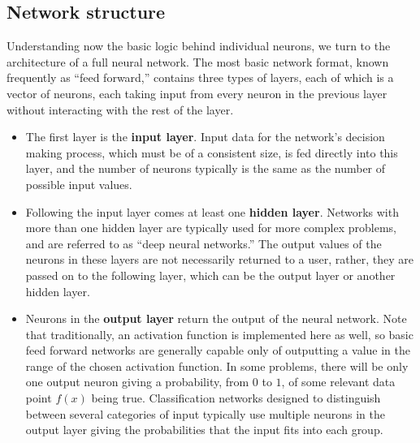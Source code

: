 \documentclass{article}
\begin{document}
\subsection{Network structure}
Understanding now the basic logic behind individual neurons, we turn to the architecture of a full neural network. The most basic network format, known frequently as ``feed forward,'' contains three types of layers, each of which is a vector of neurons, each taking input from every neuron in the previous layer without interacting with the rest of the layer.
\begin{itemize}
\item{The first layer is the \textbf{input layer}. Input data for the network's decision making process, which must be of a consistent size, is fed directly into this layer, and the number of neurons typically is the same as the number of possible input values.}
\item{Following the input layer comes at least one \textbf{hidden layer}. Networks with more than one hidden layer are typically used for more complex problems, and are referred to as ``deep neural networks.'' The output values of the neurons in these layers are not necessarily returned to a user, rather, they are passed on to the following layer, which can be the output layer or another hidden layer.}
\item{Neurons in the \textbf{output layer} return the output of the neural network. Note that traditionally, an activation function is implemented here as well, so basic feed forward networks are generally capable only of outputting a value in the range of the chosen activation function. In some problems, there will be only one output neuron giving a probability, from $0$ to $1$, of some relevant data point $f(x)$ being true. Classification networks designed to distinguish between several categories of input typically use multiple neurons in the output layer giving the probabilities that the input fits into each group.}
\end{itemize}
\end{document}
